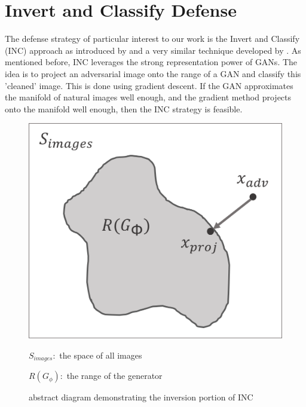 \documentclass[twoside]{article}
\theoremstyle{definition}
\begin{document}
\section{Invert and Classify Defense}
The defense strategy of particular interest to our work is the Invert and Classify (INC) approach as introduced by \cite{ilyas2017} and a very similar technique developed by \cite{pixel}. As mentioned before, INC leverages the strong representation power
of GANs. The idea is to project an adversarial image onto the range of a GAN and classify this 'cleaned' image.
This is done using gradient descent. If the GAN approximates the manifold of natural images well enough, and
the gradient method projects onto the manifold well enough, then the INC strategy is feasible.

\begin{figure}[H]
    \caption{abstract diagram demonstrating the inversion portion of INC}
    \centering
    \includegraphics[scale=0.3]{./projection_diagram.png}
    
    $S_{images}:$ the space of all images 
    
    $R(G_{\phi}):$ the range of the generator
    \label{fig:my_label}
\end{figure}
\end{document}
